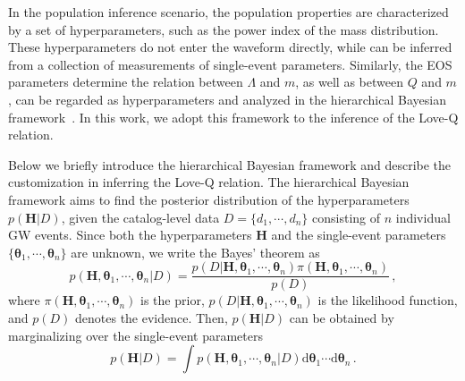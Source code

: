 \documentclass[a4paper,11pt]{article}
\begin{document}
In the population inference scenario, the population properties are
characterized by a set of hyperparameters, such as the power index of the mass
distribution. These hyperparameters do not enter the waveform directly, while
can be inferred from a collection of measurements of single-event parameters.
Similarly, the EOS parameters determine the relation between $\Lambda$ and $m$,
as well as between $Q$ and $m$, can be regarded as hyperparameters and analyzed
in the hierarchical Bayesian framework~\cite{Mandel:2009nx, Mandel:2009pc,
Adams:2012qw, Lackey:2014fwa, Mandel:2018mve, Golomb:2021tll, KAGRA:2021duu,
Wang:2024xon}. In this work, we adopt this framework to the inference of the
Love-Q relation.

Below we briefly introduce the hierarchical Bayesian framework and describe the
customization in inferring the Love-Q relation.  The hierarchical Bayesian
framework aims to find the posterior distribution of the hyperparameters
$p(\bm{H}|D)$, given the catalog-level data $D=\{d_1,\cdots,d_n\}$ consisting of
$n$ individual GW events.  Since both the hyperparameters $\bm{H}$ and the
single-event parameters $\{\bm{\theta}_1,\cdots,\bm{\theta}_n\}$ are unknown, we
write the Bayes' theorem as 
\begin{equation}
\label{bayes2}
p(\bm{H},\bm{\theta}_1, \cdots,\bm{\theta}_n|D) =\frac{p(D|\bm{H},
\bm{\theta}_1, \cdots,\bm{\theta}_n)\pi(\bm{H}, \bm{\theta}_1,
\cdots,\bm{\theta}_n)}{p(D)}\,,
\end{equation}
where $\pi(\bm{H},\bm{\theta}_1,\cdots,\bm{\theta}_n)$ is the prior,
$p(D|\bm{H},\bm{\theta}_1,\cdots,\bm{\theta}_n)$ is the likelihood function, and
$p(D)$ denotes the evidence. Then, $p(\bm{H}|D)$ can be obtained by 
marginalizing over the single-event parameters
\begin{equation}
\label{bayes1}
p(\bm{H}|D) = \int p(\bm{H},\bm{\theta}_1, \cdots, \bm{\theta}_n|D) \text{d}
\bm{\theta}_1\cdots\text{d} \bm{\theta}_n\,.
\end{equation}
\end{document}
